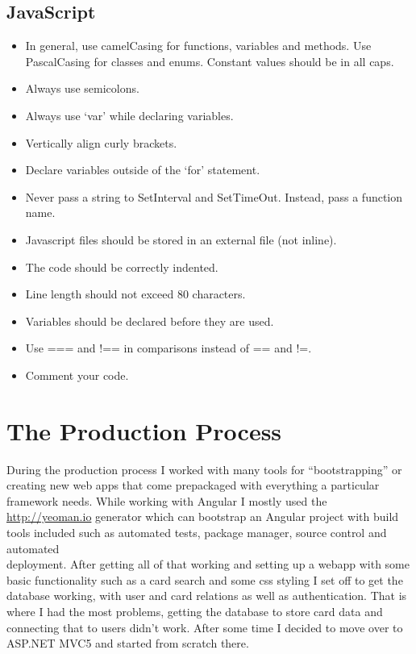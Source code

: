 \documentclass[paper=a4, fontsize=11pt]{scrartcl} %
\numberwithin{equation}{section} %
\numberwithin{figure}{section} %
\numberwithin{table}{section} %
\begin{document}
  \subsection{JavaScript}
  \begin{itemize}
    \item In general, use camelCasing for functions, variables and methods. Use PascalCasing for classes and enums. Constant values should be in all caps.
    \item Always use semicolons.
    \item Always use ‘var’ while declaring variables.
    \item Vertically align curly brackets.
    \item Declare variables outside of the ‘for’ statement.
    \item Never pass a string to SetInterval and SetTimeOut. Instead, pass a function name.
    \item Javascript files should be stored in an external file (not inline).
    \item The code should be correctly indented.
    \item Line length should not exceed 80 characters.
    \item Variables should be declared before they are used.
    \item Use === and !== in comparisons instead of == and !=.
    \item Comment your code.
    \end{itemize}
  

\clearpage

\section{The Production Process}
During the production process I worked with many tools for “bootstrapping” or creating new web apps that come prepackaged with everything a particular framework needs. While working with Angular I mostly used the \href{http://yeoman.io}{http://yeoman.io} generator which can bootstrap an Angular project with build tools included such as automated tests, package manager, source control and automated \\ deployment. After getting all of that working and setting up a webapp with some basic functionality such as a card search and some css styling I set off to get the database working, with user and card relations as well as authentication. That is where I had the most problems, getting the database to store card data and connecting that to users didn’t work. After some time I decided to move over to ASP.NET MVC5 and started from scratch there.
  
\end{document}

